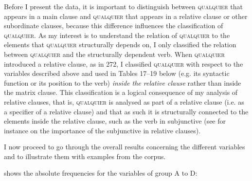 \documentclass[output=paper]{langscibook}
\begin{document}
  Before I present the data, it is important to distinguish between \textsc{qualquier} that appears in a main clause and \textsc{qualquier} that appears in a relative clause or other subordinate clauses, because this difference influences the classification of \textsc{qualquier}. As my interest is to understand the relation of \textsc{qualquier} to the elements that \textsc{qualquier} structurally depends on, I only classified the relation between \textsc{qualquier} and the structurally dependent verb. When \textsc{qualquier} introduced a relative clause, as in 272, I classified \textsc{qualquier} with respect to the variables described above and used in Tables 17–19 below (e.g. its syntactic function or its position to the verb) \textit{inside the relative clause} rather than inside the matrix clause. This classification is a logical consequence of my analysis of relative clauses, that is, \textsc{qualquier} is analysed as part of a relative clause (i.e. as a specifier of a relative clause) and that as such it is structurally connected to the elements inside the relative clause, such as the verb in subjunctive (see for instance \citealt{Quer2000} on the importance of the subjunctive in relative clauses).

  I now proceed to go through the overall results concerning the different variables and to illustrate them with examples from the corpus.

   shows the absolute frequencies for the variables of group A to D:
\end{document}

